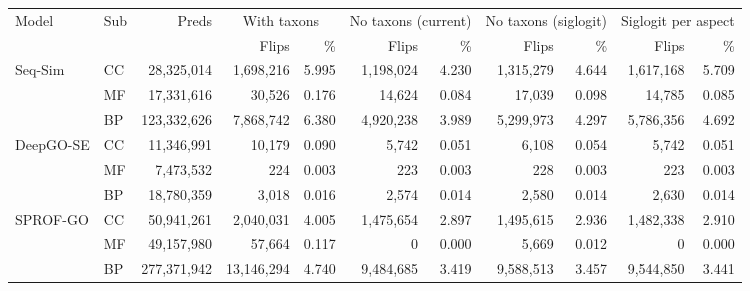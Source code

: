 \begin{tabular}{llrrrrrrrrr}
\toprule
Model & Sub & Preds & \multicolumn{2}{c}{With taxons} & \multicolumn{2}{c}{No taxons (current)} & \multicolumn{2}{c}{No taxons (siglogit)} & \multicolumn{2}{c}{Siglogit per aspect} \\
\cmidrule(lr){4-5}\cmidrule(lr){6-7}\cmidrule(lr){8-9}\cmidrule(lr){10-11}
& & & Flips & \% & Flips & \% & Flips & \% & Flips & \% \\
\midrule
Seq-Sim & CC & 28{,}325{,}014 & 1{,}698{,}216 & 5.995 & 1{,}198{,}024 & 4.230 & 1{,}315{,}279 & 4.644 & 1{,}617{,}168 & 5.709 \\
 & MF & 17{,}331{,}616 & 30{,}526 & 0.176 & 14{,}624 & 0.084 & 17{,}039 & 0.098 & 14{,}785 & 0.085 \\
 & BP & 123{,}332{,}626 & 7{,}868{,}742 & 6.380 & 4{,}920{,}238 & 3.989 & 5{,}299{,}973 & 4.297 & 5{,}786{,}356 & 4.692 \\
\midrule
DeepGO-SE & CC & 11{,}346{,}991 & 10{,}179 & 0.090 & 5{,}742 & 0.051 & 6{,}108 & 0.054 & 5{,}742 & 0.051 \\
 & MF & 7{,}473{,}532 & 224 & 0.003 & 223 & 0.003 & 228 & 0.003 & 223 & 0.003 \\
 & BP & 18{,}780{,}359 & 3{,}018 & 0.016 & 2{,}574 & 0.014 & 2{,}580 & 0.014 & 2{,}630 & 0.014 \\
\midrule
SPROF-GO & CC & 50{,}941{,}261 & 2{,}040{,}031 & 4.005 & 1{,}475{,}654 & 2.897 & 1{,}495{,}615 & 2.936 & 1{,}482{,}338 & 2.910 \\
 & MF & 49{,}157{,}980 & 57{,}664 & 0.117 & 0 & 0.000 & 5{,}669 & 0.012 & 0 & 0.000 \\
 & BP & 277{,}371{,}942 & 13{,}146{,}294 & 4.740 & 9{,}484{,}685 & 3.419 & 9{,}588{,}513 & 3.457 & 9{,}544{,}850 & 3.441 \\
\bottomrule
\end{tabular}
